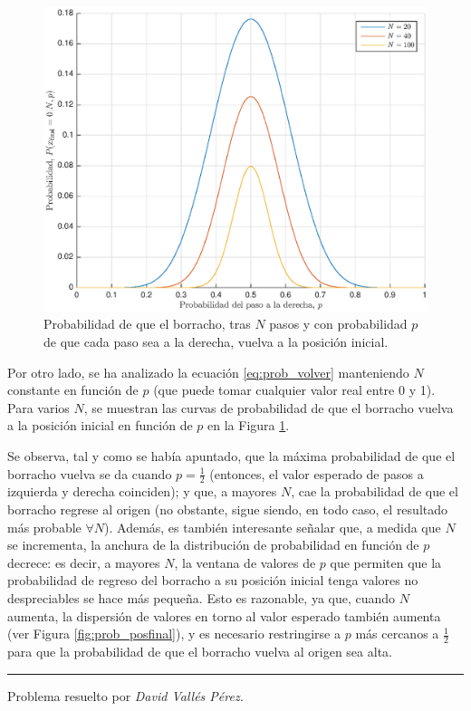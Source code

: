 \begin{figure}[h!]
	\centering
	\includegraphics[width = 0.8\linewidth]{prob_volver}
	\vspace{-0.5cm}
	\caption{\small Probabilidad de que el borracho, tras $N$ pasos y con probabilidad $p$ de que cada paso sea a la derecha, vuelva a la posición inicial.}
	\label{fig:prob_volver}
\end{figure}

Por otro lado, se ha analizado la ecuación \ref{eq:prob_volver} manteniendo $N$ constante en función de $p$ (que puede tomar cualquier valor real entre 0 y 1). Para varios $N$, se muestran las curvas de probabilidad de que el borracho vuelva a la posición inicial en función de $p$ en la Figura \ref{fig:prob_volver}.

Se observa, tal y como se había apuntado, que la máxima probabilidad de que el borracho vuelva se da cuando $p = \frac{1}{2}$ (entonces, el valor esperado de pasos a izquierda y derecha coinciden); y que, a mayores $N$, cae la probabilidad de que el borracho regrese al origen (no obstante, sigue siendo, en todo caso, el resultado más probable $\forall N$). Además, es también interesante señalar que, a medida que $N$ se incrementa, la anchura de la distribución de probabilidad en función de $p$ decrece: es decir, a mayores $N$, la ventana de valores de $p$ que permiten que la probabilidad de regreso del borracho a su posición inicial tenga valores no despreciables se hace más pequeña. Esto es razonable, ya que, cuando $N$ aumenta, la dispersión de valores en torno al valor esperado también aumenta (ver Figura \ref{fig:prob_posfinal}), y es necesario restringirse a $p$ más cercanos a $\frac{1}{2}$ para que la probabilidad de que el borracho vuelva al origen sea alta.

\rule{300pt}{0.1pt}

\begin{flushright}
	Problema resuelto por \emph{David Vallés Pérez.}
\end{flushright}


